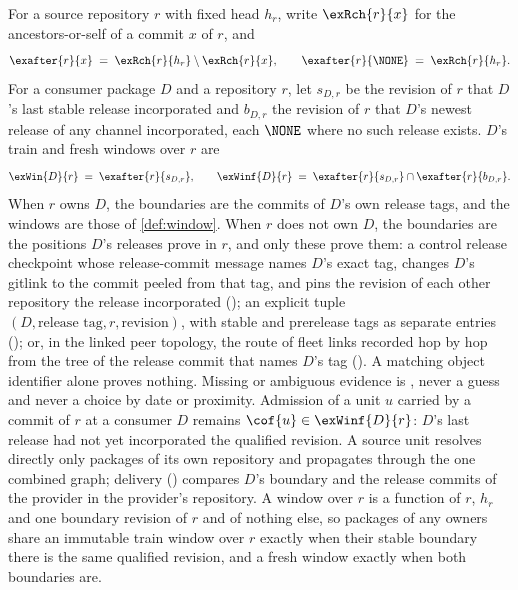 \begin{definition}
\label{def:exec-windows}
For a source repository $r$ with fixed head $h_r$, write $\exRch{r}{x}$ for
the ancestors-or-self of a commit $x$ of $r$, and
\[
  \exafter{r}{x} \;=\; \exRch{r}{h_r} \setminus \exRch{r}{x},
  \qquad
  \exafter{r}{\NONE} \;=\; \exRch{r}{h_r}.
\]
For a consumer package $D$ and a repository $r$, let $s_{D,r}$ be the
revision of $r$ that $D$'s last stable release incorporated and $b_{D,r}$ the
revision of $r$ that $D$'s newest release of any channel incorporated, each
$\NONE$ where no such release exists. $D$'s train and fresh windows over $r$
are
\[
  \exWin{D}{r} \;=\; \exafter{r}{s_{D,r}},
  \qquad
  \exWinf{D}{r} \;=\; \exafter{r}{s_{D,r}} \cap \exafter{r}{b_{D,r}}.
\]
When $r$ owns $D$, the boundaries are the commits of $D$'s own release tags,
and the windows are those of \cref{def:window}. When $r$ does not own $D$,
the boundaries are the positions $D$'s releases prove in $r$, and only these
prove them: a control release checkpoint whose release-commit message names
$D$'s exact tag, changes $D$'s gitlink to the commit peeled from that tag, and
pins the revision of each other repository the release incorporated
(); an explicit  tuple $(D,
\text{release tag}, r, \text{revision})$, with stable and prerelease tags as
separate entries (); or, in the linked peer topology, the route of
fleet links recorded hop by hop from the tree of the release commit that
names $D$'s tag (). A matching object identifier alone proves
nothing. Missing or ambiguous evidence is , never a guess and
never a choice by date or proximity. Admission of a unit $u$ carried by a
commit of $r$ at a consumer $D$ remains $\cof{u} \in \exWinf{D}{r}$: $D$'s
last release had not yet incorporated the qualified revision. A source unit
resolves directly only packages of its own repository and propagates through
the one combined graph; delivery () compares $D$'s boundary and
the release commits of the provider in the provider's repository. A window
over $r$ is a function of $r$, $h_r$ and one boundary revision of $r$ and of
nothing else, so packages of any owners share an immutable train window over
$r$ exactly when their stable boundary there is the same qualified revision,
and a fresh window exactly when both boundaries are.
\end{definition}

